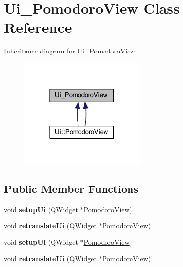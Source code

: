\hypertarget{class_ui___pomodoro_view}{}\section{Ui\+\_\+\+Pomodoro\+View Class Reference}
\label{class_ui___pomodoro_view}


Inheritance diagram for Ui\+\_\+\+Pomodoro\+View\+:
\nopagebreak
\begin{figure}[H]
\begin{center}
\leavevmode
\includegraphics[width=178pt]{class_ui___pomodoro_view__inherit__graph}
\end{center}
\end{figure}
\subsection*{Public Member Functions}
\begin{DoxyCompactItemize}
\item 
void {\bfseries setup\+Ui} (Q\+Widget $\ast$\hyperlink{class_pomodoro_view}{Pomodoro\+View})\hypertarget{class_ui___pomodoro_view_ac32ca76a964942290e48988fe6f9eef3}{}\label{class_ui___pomodoro_view_ac32ca76a964942290e48988fe6f9eef3}

\item 
void {\bfseries retranslate\+Ui} (Q\+Widget $\ast$\hyperlink{class_pomodoro_view}{Pomodoro\+View})\hypertarget{class_ui___pomodoro_view_a3e4d7f8112dc218a333c71ff196d05ab}{}\label{class_ui___pomodoro_view_a3e4d7f8112dc218a333c71ff196d05ab}

\item 
void {\bfseries setup\+Ui} (Q\+Widget $\ast$\hyperlink{class_pomodoro_view}{Pomodoro\+View})\hypertarget{class_ui___pomodoro_view_ac32ca76a964942290e48988fe6f9eef3}{}\label{class_ui___pomodoro_view_ac32ca76a964942290e48988fe6f9eef3}

\item 
void {\bfseries retranslate\+Ui} (Q\+Widget $\ast$\hyperlink{class_pomodoro_view}{Pomodoro\+View})\hypertarget{class_ui___pomodoro_view_a3e4d7f8112dc218a333c71ff196d05ab}{}\label{class_ui___pomodoro_view_a3e4d7f8112dc218a333c71ff196d05ab}

\end{DoxyCompactItemize}
